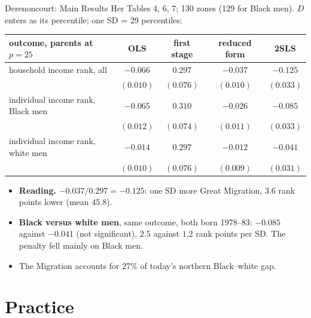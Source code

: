 \documentclass[aspectratio=169,11pt,xcolor=dvipsnames]{beamer}
\begin{document}
\begin{frame}{Derenoncourt: Main Results}
Her Tables 4, 6, 7; 130 zones (129 for Black men). $D$ enters as its percentile; one SD = 29 percentiles:
\vskip-4pt
\begin{center}\footnotesize
\renewcommand{\arraystretch}{1.0}
\begin{tabular}{@{}lcccc@{}}
\toprule
outcome, parents at $p = 25$ & OLS & first stage & reduced form & 2SLS \\
\midrule
household income rank, all & $-0.066$ & $0.297$ & $-0.037$ & $-0.125$ \\
 & $(0.010)$ & $(0.076)$ & $(0.010)$ & $(0.033)$ \\
individual income rank, Black men & $-0.065$ & $0.310$ & $-0.026$ & $-0.085$ \\
 & $(0.012)$ & $(0.074)$ & $(0.011)$ & $(0.033)$ \\
individual income rank, white men & $-0.014$ & $0.297$ & $-0.012$ & $-0.041$ \\
 & $(0.010)$ & $(0.076)$ & $(0.009)$ & $(0.031)$ \\
\bottomrule
\end{tabular}
\end{center}
\vskip-4pt
\begin{itemize}\itemsep1pt
  \item \textbf{Reading.} $-0.037/0.297 = -0.125$: one SD more Great
        Migration, $3.6$ rank points lower (mean $45.8$).
  \item \textbf{Black versus white men}, same outcome, both born 1978--83:
        $-0.085$ against $-0.041$ (not significant), $2.5$ against $1.2$ rank
        points per SD. The penalty fell mainly on Black men.
  \item The Migration accounts for 27\% of today's northern Black--white gap.
\end{itemize}
\end{frame}

\section[Practice]{Practice}
\begin{frame}\sectionpage\end{frame}
\end{document}
